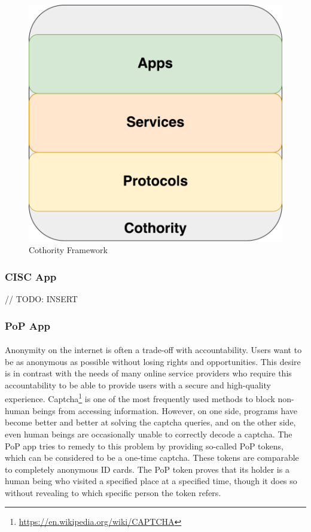\begin{figure}[h]
\includegraphics[scale=.5]{graphic/cothority.pdf}
\centering
\caption*{Cothority Framework}
\end{figure}

\subsubsection*{CISC App}

// TODO: INSERT

\subsubsection*{PoP App\raisebox{.3\baselineskip}{\normalsize\footnotemark}}

\paragraph{}
Anonymity on the internet is often a trade-off with accountability. Users want to be as anonymous as possible without losing rights and opportunities. This desire is in contrast with the needs of many online service providers who require this accountability to be able to provide users with a secure and high-quality experience. Captcha\footnote{\url{https://en.wikipedia.org/wiki/CAPTCHA}} is one of the most frequently used methods to block non-human beings from accessing information. However, on one side, programs have become better and better at solving the captcha queries, and on the other side, even human beings are occasionally unable to correctly decode a captcha. The PoP app tries to remedy to this problem by providing so-called PoP tokens, which can be considered to be a one-time captcha. These tokens are comparable to completely anonymous ID cards. The PoP token proves that its holder is a human being who visited a specified place at a specified time, though it does so without revealing to which specific person the token refers.
